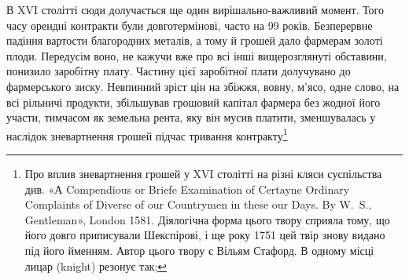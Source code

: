 В XVI столітті сюди долучається ще один вирішально-важливий
момент. Того часу орендні контракти були довготермінові,
часто на 99 років. Безперервне падіння вартости благородних
металів, а тому й грошей дало фармерам золоті плоди. Передусім
воно, не кажучи вже про всі інші вищерозглянуті обставини,
понизило заробітну плату. Частину цієї заробітної плати долучувано
до фармерського зиску. Невпинний зріст цін на збіжжя,
вовну, м’ясо, одне слово, на всі рільничі продукти, збільшував
грошовий капітал фармера без жодної його участи, тимчасом
як земельна рента, яку він мусив платити, зменшувалась у наслідок
зневартнення грошей підчас тривання контракту\footnote{
Про вплив зневартнення грошей у XVI столітті на різні кляси
суспільства див. «А Compendious or Briefe Examination of Certayne Ordinary
Complaints of Diverse of our Countrymen in these our Days. By
W.~S., Gentleman», London 1581. Діялогічна форма цього твору сприяла
тому, що його довго приписували Шекспірові, і ще року 1751 цей твір
знову видано під його йменням. Автор цього твору є Вільям Стафорд.
В одному місці лицар (knight) резонує так;

}
